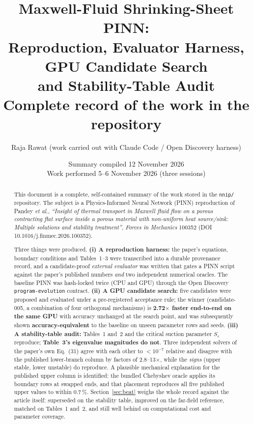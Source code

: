 \documentclass[11pt,a4paper]{article}
\title{\textbf{Maxwell-Fluid Shrinking-Sheet PINN:\\
Reproduction, Evaluator Harness, GPU Candidate Search\\
and Stability-Table Audit}\\[0.6em]
\large Complete record of the work in the \code{nnip/} repository}
\author{Raja Rawat \quad (work carried out with Claude Code / Open Discovery harness)}
\date{Summary compiled 12 November 2026 \\ \small Work performed 5--6 November 2026 (three sessions)}
\newcommand{\code}[1]{\texttt{\small #1}}
\newcommand{\pct}{\,\%}
\begin{document}
\maketitle

\begin{abstract}
\noindent
This document is a complete, self-contained summary of the work stored in the
\code{nnip/} repository. The subject is a Physics-Informed Neural Network (PINN)
reproduction of Pandey \textit{et al.}, \emph{``Insight of thermal transport in Maxwell
fluid flow on a porous contracting flat surface inside a porous material with
non-uniform heat source/sink: Multiple solutions and stability treatment''},
\emph{Forces in Mechanics} 100352 (DOI 10.1016/j.finmec.2026.100352).

Three things were produced. \textbf{(i) A reproduction harness:} the paper's equations,
boundary conditions and Tables~1--3 were transcribed into a durable provenance record,
and a candidate-proof \emph{external evaluator} was written that gates a PINN script
against the paper's published numbers \emph{and} two independent numerical oracles. The
baseline PINN was hash-locked twice (CPU and GPU) through the Open Discovery
\code{program-evolution} contract. \textbf{(ii) A GPU candidate search:} five candidates
were proposed and evaluated under a pre-registered acceptance rule; the winner
(candidate-005, a combination of four orthogonal mechanisms) is
\textbf{2.72$\times$ faster end-to-end on the same GPU} with accuracy unchanged at the
search point, and was subsequently shown \textbf{accuracy-equivalent} to the baseline on
unseen parameter rows and seeds. \textbf{(iii) A stability-table audit:} Tables~1 and~2
and the critical suction parameter $S_c$ reproduce; \textbf{Table~3's eigenvalue
magnitudes do not}. Three independent solvers of the paper's own Eq.~(31) agree with each
other to $<10^{-7}$ relative and disagree with the published lower-branch column by factors
of 2.8--13$\times$, while the \emph{signs} (upper stable, lower unstable) do reproduce. A
plausible mechanical explanation for the published upper column is identified: the bundled
Chebyshev oracle applies its boundary rows at swapped ends, and that placement reproduces
all five published upper values to within $0.7\pct$. Section~\ref{sec:beat} weighs the
whole record against the article itself: superseded on the stability table, improved on the
far-field reference, matched on Tables~1 and~2, and still well behind on computational cost
and parameter coverage.
\end{abstract}
\end{document}
